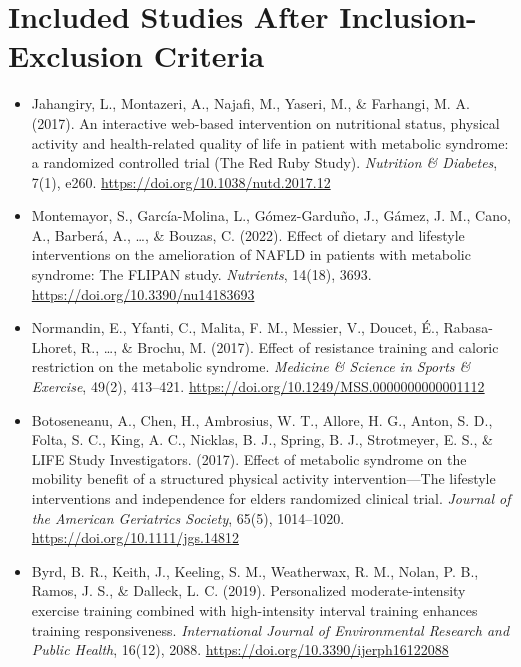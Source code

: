 \section*{Included Studies After Inclusion-Exclusion Criteria}
\begin{itemize}
    \item Jahangiry, L., Montazeri, A., Najafi, M., Yaseri, M., \& Farhangi, M. A. (2017). An interactive web-based intervention on nutritional status, physical activity and health-related quality of life in patient with metabolic syndrome: a randomized controlled trial (The Red Ruby Study). \textit{Nutrition \& Diabetes}, 7(1), e260. \url{https://doi.org/10.1038/nutd.2017.12}

    \item Montemayor, S., García-Molina, L., Gómez-Garduño, J., Gámez, J. M., Cano, A., Barberá, A., \ldots, \& Bouzas, C. (2022). Effect of dietary and lifestyle interventions on the amelioration of NAFLD in patients with metabolic syndrome: The FLIPAN study. \textit{Nutrients}, 14(18), 3693. \url{https://doi.org/10.3390/nu14183693}

    \item Normandin, E., Yfanti, C., Malita, F. M., Messier, V., Doucet, É., Rabasa-Lhoret, R., \ldots, \& Brochu, M. (2017). Effect of resistance training and caloric restriction on the metabolic syndrome. \textit{Medicine \& Science in Sports \& Exercise}, 49(2), 413–421. \url{https://doi.org/10.1249/MSS.0000000000001112}

    \item Botoseneanu, A., Chen, H., Ambrosius, W. T., Allore, H. G., Anton, S. D., Folta, S. C., King, A. C., Nicklas, B. J., Spring, B. J., Strotmeyer, E. S., \& LIFE Study Investigators. (2017). Effect of metabolic syndrome on the mobility benefit of a structured physical activity intervention—The lifestyle interventions and independence for elders randomized clinical trial. \textit{Journal of the American Geriatrics Society}, 65(5), 1014–1020. \url{https://doi.org/10.1111/jgs.14812}

    \item Byrd, B. R., Keith, J., Keeling, S. M., Weatherwax, R. M., Nolan, P. B., Ramos, J. S., \& Dalleck, L. C. (2019). Personalized moderate-intensity exercise training combined with high-intensity interval training enhances training responsiveness. \textit{International Journal of Environmental Research and Public Health}, 16(12), 2088. \url{https://doi.org/10.3390/ijerph16122088}


\end{itemize}
